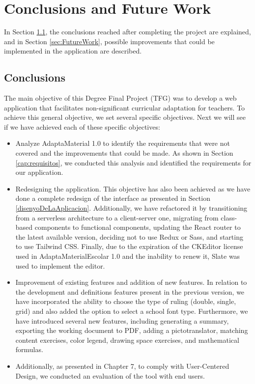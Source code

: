 \chapter{Conclusions and Future Work}
\label{cap:conclusions}


In Section \ref{sec:conclusions}, the conclusions reached after completing the project are explained, and in Section \ref{sec:FutureWork}, possible improvements that could be implemented in the application are described.

\section{Conclusions}
\label{sec:conclusions}
The main objective of this Degree Final Project (TFG) was to develop a web application that facilitates non-significant curricular adaptation for teachers. To achieve this general objective, we set several specific objectives. Next we will see if we have achieved each of these specific objectives:

\begin{itemize}
    \item Analyze AdaptaMaterial 1.0 to identify the requirements that were not covered and the improvements that could be made. As shown in Section \ref{cap:requisitos}, we conducted this analysis and identified the requirements for our application.
    \item Redesigning the application. This objective has also been achieved as we have done a complete redesign of the interface as presented in Section \ref{disenyoDeLaAplicacion}. Additionally, we have refactored it by transitioning from a serverless architecture to a client-server one, migrating from class-based components to functional components, updating the React router to the latest available version, deciding not to use Redux or Sass, and starting to use Tailwind CSS. Finally, due to the expiration of the CKEditor license used in AdaptaMaterialEscolar 1.0 and the inability to renew it, Slate was used to implement the editor.
    \item Improvement of existing features and addition of new features. In relation to the development and definitions features present in the previous version, we have incorporated the ability to choose the type of ruling (double, single, grid) and also added the option to select a school font type. Furthermore, we have introduced several new features, including generating a summary, exporting the working document to PDF, adding a pictotranslator, matching content exercises, color legend, drawing space exercises, and mathematical formulas.
    \item Additionally, as presented in Chapter 7, to comply with User-Centered Design, we conducted an evaluation of the tool with end users.
\end{itemize}




